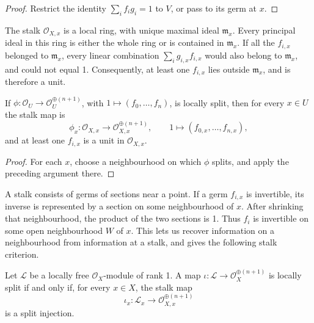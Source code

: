 \begin{proof}
    Restrict the identity \(\sum_i f_i g_i=1\) to \(V\), or pass to its germ
    at \(x\).
\end{proof}

The stalk \(\mathcal{O}_{X,x}\) is a local ring, with unique maximal ideal
\(\mathfrak{m}_x\). Every principal ideal in this ring is either the whole
ring or is contained in \(\mathfrak{m}_x\). If all the \(f_{i,x}\) belonged
to \(\mathfrak{m}_x\), every linear combination
\(\sum_i g_{i,x}f_{i,x}\) would also belong to \(\mathfrak{m}_x\), and could
not equal 1. Consequently, at least one \(f_{i,x}\) lies outside
\(\mathfrak{m}_x\), and is therefore a unit.

\begin{corollary}\label{cor:lsi-unit-at-stalks}
    If \(\phi:\mathcal{O}_U\to\mathcal{O}_U^{\oplus(n+1)}\), with
    \(1\mapsto(f_0,\dots,f_n)\), is locally split, then for every \(x\in U\)
    the stalk map is
    \[
        \phi_x:\mathcal{O}_{X,x}
        \longrightarrow\mathcal{O}_{X,x}^{\oplus(n+1)},
        \qquad 1\longmapsto(f_{0,x},\dots,f_{n,x}),
    \]
    and at least one \(f_{i,x}\) is a unit in \(\mathcal{O}_{X,x}\).
\end{corollary}

\begin{proof}
    For each \(x\), choose a neighbourhood on which \(\phi\) splits, and
    apply the preceding argument there.
\end{proof}

A stalk consists of germs of sections near a point. If a germ \(f_{i,x}\)
is invertible, its inverse is represented by a section on some
neighbourhood of \(x\). After shrinking that neighbourhood, the product
of the two sections is 1. Thus \(f_i\) is invertible on some open
neighbourhood \(W\) of \(x\). This lets us recover information on a
neighbourhood from information at a stalk, and gives the following stalk
criterion.

\begin{proposition}\label{prop:lsi-stalk-criterion}
    Let \(\mathcal{L}\) be a locally free \(\mathcal{O}_X\)-module of rank 1.
    A map
    \(\iota:\mathcal{L}\to\mathcal{O}_X^{\oplus(n+1)}\) is locally split
    if and only if, for every \(x\in X\), the stalk map
    \[
        \iota_x:\mathcal{L}_x
        \longrightarrow\mathcal{O}_{X,x}^{\oplus(n+1)}
    \]
    is a split injection.
\end{proposition}


